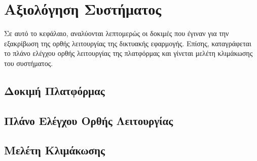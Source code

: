 \chapter{Αξιολόγηση Συστήματος}
Σε αυτό το κεφάλαιο, αναλύονται λεπτομερώς οι δοκιμές που έγιναν για την εξακρίβωση της ορθής λειτουργίας της δικτυακής εφαρμογής. Επίσης, καταγράφεται το πλάνο ελέγχου ορθής λειτουργίας της πλατφόρμας και γίνεται μελέτη κλιμάκωσης του συστήματος.

\section{Δοκιμή Πλατφόρμας}

\section{Πλάνο Ελέγχου Ορθής Λειτουργίας}

\section{Μελέτη Κλιμάκωσης}
